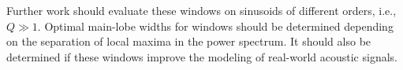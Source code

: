 \documentclass[twoside,a4paper]{article}
\begin{document}
Further work should evaluate these windows on sinusoids of different orders,
i.e., $Q \gg 1$. Optimal main-lobe widths for windows should be determined
depending on the separation of local maxima in the power spectrum. It should
also be determined if these windows improve the modeling of real-world acoustic
signals.




\end{document}
